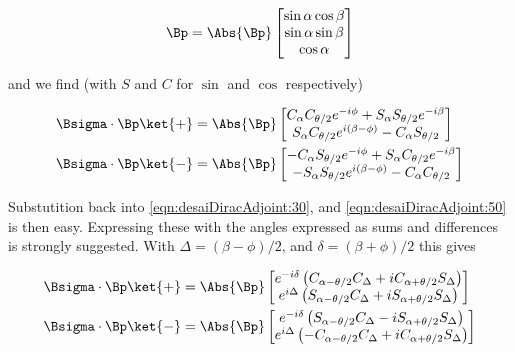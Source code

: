 \begin{equation}\label{eqn:desaiDiracAdjoint:340}
\Bp = 
\Abs{\Bp}
\begin{bmatrix}
\sin\alpha \cos\beta \\
\sin\alpha \sin\beta \\
\cos\alpha 
\end{bmatrix}
\end{equation}

and we find (with $S$ and $C$ for $\sin$ and $\cos$ respectively)

\begin{subequations}
\begin{align}\label{eqn:desaiDiracAdjoint:360}
\Bsigma \cdot \Bp \ket{+}
&=
\Abs{\Bp}
\begin{bmatrix}
 C_\alpha C_{\theta/2} e^{-i \phi} + S_\alpha S_{\theta/2} e^{-i \beta} \\
 S_\alpha C_{\theta/2} e^{i (\beta - \phi)} - C_\alpha S_{\theta/2} 
\end{bmatrix} \\
\Bsigma \cdot \Bp \ket{-}
&=
\Abs{\Bp}
\begin{bmatrix}
- C_\alpha S_{\theta/2} e^{-i \phi} + S_\alpha C_{\theta/2} e^{-i \beta} \\
- S_\alpha S_{\theta/2} e^{i (\beta - \phi)} - C_\alpha C_{\theta/2} 
\end{bmatrix}
\end{align}
\end{subequations}

Substutition back into \ref{eqn:desaiDiracAdjoint:30}, and \ref{eqn:desaiDiracAdjoint:50} is then easy.  Expressing these with the angles expressed as sums and differences is strongly suggested.  With $\Delta = (\beta - \phi)/2$, and $\delta = (\beta + \phi)/2$ this gives

\begin{subequations}
\begin{align}\label{eqn:desaiDiracAdjoint:380}
\Bsigma \cdot \Bp \ket{+}
&=
\Abs{\Bp}
\begin{bmatrix}
e^{-i\delta}
\left(
C_{\alpha - \theta/2} C_\Delta + i C_{\alpha + \theta/2} S_\Delta 
\right) \\
e^{i \Delta}
\left(
S_{\alpha - \theta/2} C_\Delta + i S_{\alpha + \theta/2} S_\Delta 
\right) \\
\end{bmatrix} \\
\Bsigma \cdot \Bp \ket{-}
&=
\Abs{\Bp}
\begin{bmatrix}
e^{-i\delta}
\left(
S_{\alpha - \theta/2} C_\Delta - i S_{\alpha + \theta/2} S_\Delta 
\right) \\
e^{i \Delta}
\left(
-C_{\alpha - \theta/2} C_\Delta + i C_{\alpha + \theta/2} S_\Delta 
\right) \\
\end{bmatrix} 
\end{align}
\end{subequations}

